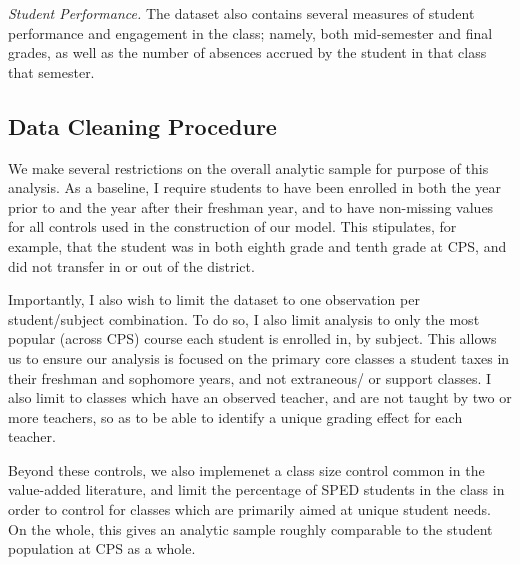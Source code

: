 \documentclass[../thesis_main.tex]{subfiles}
\begin{document}
\textit{Student Performance.} The dataset also contains several measures of student performance and engagement in the class; namely, both mid-semester and final grades, as well as the number of absences accrued by the student in that class that semester. 

\subsection{Data Cleaning Procedure}

We make several restrictions on the overall analytic sample for purpose of this analysis. As a baseline, I require students to have been enrolled in both the year prior to and the year after their freshman year, and to have non-missing values for all controls used in the construction of our model. This stipulates, for example, that the student was in both eighth grade and tenth grade at CPS, and did not transfer in or out of the district. 


Importantly, I also wish to limit the dataset to one observation per student/subject combination. To do so, I also limit analysis to only the most popular (across CPS) course each student is enrolled in, by subject. This allows us to ensure our analysis is focused on the primary core classes a student taxes in their freshman and sophomore years, and not extraneous/ or support classes. I also limit to classes which have an observed teacher, and are not taught by two or more teachers, so as to be able to identify a unique grading effect for each teacher. 

Beyond these controls, we also implemenet a class size control common in the value-added literature, and limit the percentage of SPED students in the class in order to control for classes which are primarily aimed at unique student needs. On the whole, this gives an analytic sample roughly comparable to the student population at CPS as a whole. 
\end{document}
